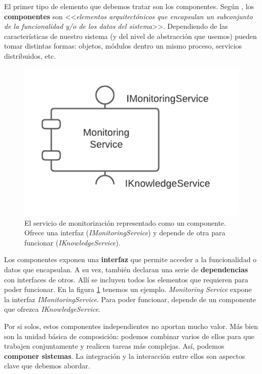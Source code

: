 El primer tipo de elemento que debemos tratar son los componentes. Según \cite{taylorSoftwareArchitectureFoundations2009}, los \textbf{componentes} son <<\emph{elementos arquitectónicos que encapsulan un subconjunto de la funcionalidad y/o de los datos del sistema}>>. Dependiendo de las características de nuestro sistema (y del nivel de abstracción que usemos) pueden tomar distintas formas: objetos, módulos dentro un mismo proceso, servicios distribuidos, etc.

\begin{figure}
  \centering
  \includegraphics[scale=0.8]{cap_contexto_tecnologico/images/componente-ejemplo}
  \caption{El servicio de monitorización representado como un componente. Ofrece una interfaz (\emph{IMonitoringService}) y depende de otra para funcionar (\emph{IKnowledgeService}).}
  \label{fig:componenteEjemplo}
\end{figure}

Los componentes exponen una \textbf{interfaz} que permite acceder a la funcionalidad o datos que encapsulan. A su vez, también declaran una serie de \textbf{dependencias} con interfaces de otros. Allí se incluyen todos los elementos que requieren para poder funcionar. En la figura \ref{fig:componenteEjemplo} tenemos un ejemplo. \emph{Monitoring Service} expone la interfaz \emph{IMonitoringService}. Para poder funcionar, depende de un componente que ofrezca \emph{IKnowledgeService}.

Por si solos, estos componentes independientes no aportan mucho valor. Más bien son la unidad básica de composición: podemos combinar varios de ellos para que trabajen conjuntamente y realicen tareas más complejas. Así, podemos \textbf{componer sistemas}. \cite{mehtaTaxonomySoftwareConnectors2000} La integración y la interacción entre ellos son aspectos clave que debemos abordar.

